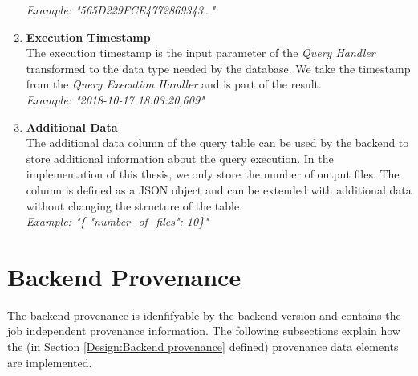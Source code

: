 \documentclass[draft,final]{vutinfth} %
\begin{document}
\begin{enumerate}
	\textit{Example: "565D229FCE4772869343\dots"} 
	\item \textbf{Execution Timestamp} \\
	The execution timestamp is the input parameter of the \textit{Query Handler} transformed to the data type needed by the database. We take the timestamp from the \textit{Query Execution Handler} and is part of the result. \\
	\textit{Example: "2018-10-17 18:03:20,609"}  
	\item \textbf{Additional Data} \\
	The additional data column of the query table can be used by the backend to store additional information about the query execution. In the implementation of this thesis, we only store the number of output files. The column is defined as a JSON object and can be extended with additional data without changing the structure of the table. \\
	\textit{Example: "\{ "number\_of\_files": 10\}"}    	 
\end{enumerate}


\section{Backend Provenance}\label{Implementation:Backend provenance}

The backend provenance is idenfifyable by the backend version and contains the job independent provenance information. The following subsections explain how the (in Section \ref{Design:Backend provenance} defined) provenance data elements are implemented.  
\end{document}
